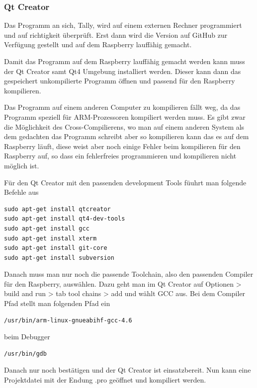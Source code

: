 \documentclass[11pt,a4paper]{article} %
\begin{document}
\subsubsection{Qt Creator}
Das Programm an sich, Tally, wird auf einem externen Rechner programmiert und auf richtigkeit überprüft. Erst dann wird die Version auf GitHub zur Verfügung gestellt und auf dem Raspberry lauffähig gemacht.
\par
Damit das Programm auf dem Raspberry lauffähig gemacht werden kann muss der Qt Creator samt Qt4 Umgebung installiert werden. Dieser kann dann das gespeichert unkompilierte Programm öffnen und passend für den Raspberry kompilieren.
\par
Das Programm auf einem anderen Computer zu kompilieren fällt weg, da das Programm speziell für ARM-Prozessoren kompiliert werden muss. Es gibt zwar die Möglichkeit des Cross-Compilierens, wo man auf einem anderen System als dem gedachten das Programm schreibt aber so kompilieren kann das es auf dem Raspberry läuft, diese weist aber noch einige Fehler beim kompilieren für den Raspberry auf, so dass ein fehlerfreies programmieren und kompilieren nicht möglich ist.
\par
Für den Qt Creator mit den passenden development Tools füuhrt man folgende Befehle aus
 \begin{frame}

\begin{lstlisting}
sudo apt-get install qtcreator
sudo apt-get install qt4-dev-tools
sudo apt-get install gcc
sudo apt-get install xterm
sudo apt-get install git-core
sudo apt-get install subversion
\end{lstlisting}

\end{frame}
\newpage
Danach muss man nur noch die passende Toolchain, also den passenden Compiler für den Raspberry, auswählen. Dazu geht man im Qt Creator auf Optionen > build and run > tab tool chains > add und wählt GCC aus. Bei dem Compiler Pfad stellt man folgenden Pfad ein
\begin{frame}

\begin{lstlisting}
/usr/bin/arm-linux-gnueabihf-gcc-4.6 
\end{lstlisting}

\end{frame} 
beim Debugger
  \begin{frame}

\begin{lstlisting}
/usr/bin/gdb
\end{lstlisting}

\end{frame}
Danach nur noch bestätigen und der Qt Creator ist einsatzbereit. Nun kann eine Projektdatei mit der Endung .pro geöffnet und kompiliert werden.
\cite{berry4}
\par
\end{document}
